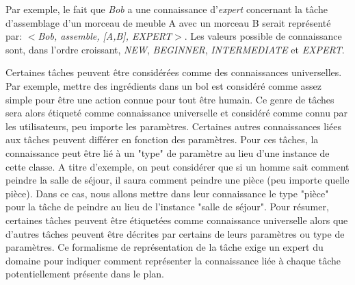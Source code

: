 \documentclass[a4paper,11pt,twoside]{StyleThese}
\begin{document}

%
Par exemple, le fait que \textit{Bob} a une connaissance d'\textit{expert} concernant la tâche d'assemblage d'un morceau de meuble A avec un morceau B serait représenté par:
\textit{$<$Bob, assemble, [A,B], EXPERT$>$}.
Les valeurs possible de connaissance sont, dans l'ordre croissant, \textit{NEW}, \textit{BEGINNER}, \textit{INTERMEDIATE} et \textit{EXPERT}. 

Certaines tâches peuvent être considérées comme des connaissances universelles. Par exemple, mettre des ingrédients dans un bol est considéré comme assez simple pour être une action connue pour tout être humain. Ce genre de tâches sera alors étiqueté comme connaissance universelle et considéré comme connu par les utilisateurs, peu importe les paramètres. Certaines autres connaissances liées aux tâches peuvent différer en fonction des paramètres. Pour ces tâches, la connaissance peut être lié à un "type" de paramètre au lieu d'une instance de cette classe.
A titre d'exemple, on peut considérer que si un homme sait comment peindre la salle de séjour, il saura comment peindre une pièce (peu importe quelle pièce). Dans ce cas, nous allons mettre dans leur connaissance le type "pièce" pour la tâche de peindre au lieu de l'instance "salle de séjour".
Pour résumer, certaines tâches peuvent être étiquetées comme connaissance universelle alors que d'autres tâches peuvent être décrites par certains de leurs paramètres ou type de paramètres.
Ce formalisme de représentation de la tâche exige un expert du domaine pour indiquer comment représenter la connaissance liée à chaque tâche potentiellement présente dans le plan.

\end{document}

